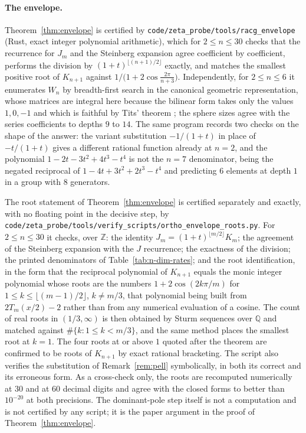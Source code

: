 \documentclass[11pt,a4paper]{article}
\newcommand{\Z}{\mathbb{Z}}
\newcommand{\Q}{\mathbb{Q}}
\theoremstyle{definition}
\theoremstyle{remark}
\theoremstyle{plain}
\begin{document}
\paragraph{The envelope.}
Theorem~\ref{thm:envelope} is certified by \texttt{code/zeta\_probe/tools/racg\_envelope}
(Rust, exact integer polynomial arithmetic), which for $2\le n\le30$ checks that the recurrence
for $J_m$ and the Steinberg expansion agree coefficient by coefficient, performs the division by
$(1+t)^{\lfloor(n+1)/2\rfloor}$ exactly, and matches the smallest positive root of $K_{n+1}$
against $1/\bigl(1+2\cos\frac{2\pi}{n+3}\bigr)$. Independently, for $2\le n\le6$ it enumerates
$W_n$ by breadth-first search in the canonical geometric representation, whose matrices are
integral here because the bilinear form takes only the values $1,0,-1$ and which is faithful by
Tits' theorem \cite{Bourbaki}; the sphere sizes agree with the series coefficients to depths $9$
to $14$. The same program records two checks on the shape of the answer: the variant substitution
$-1/(1+t)$ in place of $-t/(1+t)$ gives a different rational function already at $n=2$, and the
polynomial $1-2t-3t^2+4t^3-t^4$ is not the $n=7$ denominator, being the negated reciprocal of
$1-4t+3t^2+2t^3-t^4$ and predicting $6$ elements at depth $1$ in a group with $8$ generators.

The root statement of Theorem~\ref{thm:envelope} is certified separately and exactly, with no
floating point in the decisive step, by
\texttt{code/zeta\_probe/tools/verify\_scripts/ortho\_envelope\_roots.py}. For $2\le n\le30$ it
checks, over $\Z$: the identity $J_m=(1+t)^{\lfloor m/2\rfloor}K_m$; the agreement of the
Steinberg expansion with the $J$ recurrence; the exactness of the division; the printed
denominators of Table~\ref{tab:n-dim-rates}; and the root identification, in the form that the
reciprocal polynomial of $K_{n+1}$ equals the monic integer polynomial whose roots are the
numbers $1+2\cos(2k\pi/m)$ for $1\le k\le\lfloor(m-1)/2\rfloor$, $k\ne m/3$, that polynomial
being built from $2T_m(x/2)-2$ rather than from any numerical evaluation of a cosine. The count
of real roots in $(1/3,\infty)$ is then obtained by Sturm sequences over $\Q$ and matched
against $\#\{k:1\le k<m/3\}$, and the same method places the smallest root at $k=1$. The four
roots at or above $1$ quoted after the theorem are confirmed to be roots of $K_{n+1}$ by exact
rational bracketing. The script also verifies the substitution of Remark~\ref{rem:pell}
symbolically, in both its correct and its erroneous form. As a cross-check only, the roots are
recomputed numerically at $30$ and at $60$ decimal digits and agree with the closed forms to
better than $10^{-20}$ at both precisions. The dominant-pole step itself is not a computation
and is not certified by any script; it is the paper argument in the proof of
Theorem~\ref{thm:envelope}.
\end{document}
